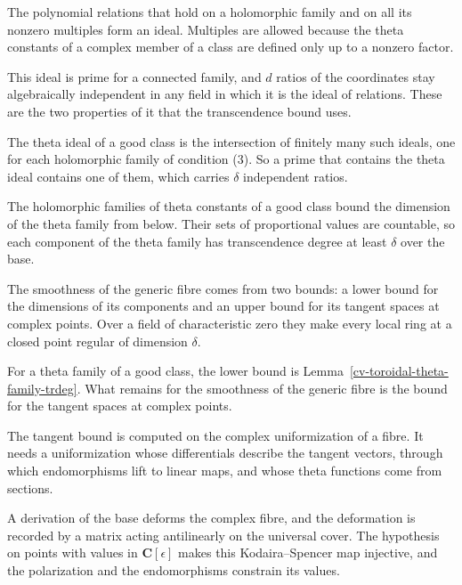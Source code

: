 The polynomial relations that hold on a holomorphic family and on all its nonzero multiples form an ideal. Multiples
are allowed because the theta constants of a complex member of a class are defined only up to a nonzero factor.

This ideal is prime for a connected family, and $d$ ratios of the coordinates stay algebraically independent in any
field in which it is the ideal of relations. These are the two properties of it that the transcendence bound uses.

The theta ideal of a good class is the intersection of finitely many such ideals, one for each holomorphic family of
condition (3). So a prime that contains the theta ideal contains one of them, which carries $\delta$ independent ratios.

The holomorphic families of theta constants of a good class bound the dimension of the theta family from
below. Their sets of proportional values are countable, so each component of the theta family has
transcendence degree at least $\delta$ over the base.

The smoothness of the generic fibre comes from two bounds: a lower bound for the dimensions of its
components and an upper bound for its tangent spaces at complex points. Over a field of characteristic
zero they make every local ring at a closed point regular of dimension $\delta$.

For a theta family of a good class, the lower bound is
Lemma~\ref{cv-toroidal-theta-family-trdeg}. What remains for the smoothness of the generic fibre is the
bound for the tangent spaces at complex points.

The tangent bound is computed on the complex uniformization of a fibre. It needs a uniformization whose differentials
describe the tangent vectors, through which endomorphisms lift to linear maps, and whose theta functions come from
sections.

A derivation of the base deforms the complex fibre, and the deformation is recorded by a matrix acting antilinearly on
the universal cover. The hypothesis on points with values in $\mathbf C[\epsilon]$ makes this Kodaira--Spencer map
injective, and the polarization and the endomorphisms constrain its values.

